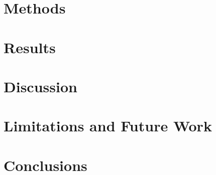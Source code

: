\documentclass[11pt]{article}
\begin{document}
\newpage
{}
{}
\tableofcontents
\newpage





\section{Methods}
\label{sec:methods}


\section{Results}
\label{sec:results}


\section{Discussion}
\label{sec:discussion}


\section{Limitations and Future Work}
\label{sec:limitations}


\section{Conclusions}
\label{sec:conclusions}


{}
\nocite{lamport1994latex,zenodo_2026,this_paper_placeholder}




\end{document}
